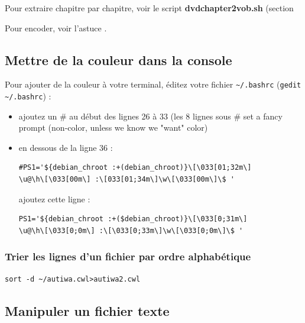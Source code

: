 \documentclass[a4paper,twoside]{article}
\begin{document}
Pour extraire chapitre par chapitre, voir le script \textbf{dvdchapter2vob.sh} (section 

Pour encoder, voir l'astuce .

\subsection{Mettre de la couleur dans la console}
Pour ajouter de la couleur à votre terminal, éditez votre fichier \verb|~/.bashrc| (\verb|gedit ~/.bashrc|) :
\begin{itemize}
\item ajoutez un \# au début des lignes 26 à 33 (les 8 lignes sous \# set a fancy prompt (non-color, unless we know we "want" color)
\item en dessous de la ligne 36 :

\begin{verbatim}
#PS1='${debian_chroot :+(debian_chroot)}\[\033[01;32m\]
\u@\h\[\033[00m\] :\[033[01;34m\]\w\[\033[00m\]\$ '\end{verbatim}

ajoutez cette ligne :

\begin{verbatim}
PS1='${debian_chroot :+($debian_chroot)}\[\033[0;31m\]
\u@\h\[\033[0;0m\] :\[\033[0;33m\]\w\[\033[0;0m\]\$ '
\end{verbatim}
\end{itemize}

\subsubsection{Trier les lignes d'un fichier par ordre alphabétique}

\begin{verbatim}
sort -d ~/autiwa.cwl>autiwa2.cwl
\end{verbatim}


\subsection{Manipuler un fichier texte}
\end{document}

